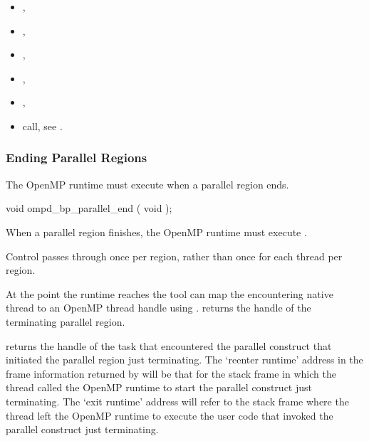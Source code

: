 \crossreferences

\begin{itemize}
\item
  , 
\item
  , 
\item
  , 
\item
  , 
\item
  , 
\item {} call, see 
  .
\end{itemize}

\subsubsection{Ending Parallel Regions}
\label{subsubsec:ompd_bp_parallel_end}

The OpenMP runtime must execute %
when a parallel region ends.


\begin{cspecific}
\begin{ompSyntax}
void ompd_bp_parallel_end ( void );
\end{ompSyntax}
\end{cspecific}


\descr

When a parallel region finishes, the OpenMP runtime must 
execute .

Control passes through 
once per region, rather than once for each thread per region.

At the point the runtime reaches 
the tool can map the encountering native thread
to an OpenMP thread handle using .
returns the handle of the terminating parallel region.

returns the handle of the task that encountered the
parallel construct that initiated the parallel region just
terminating.
The `reenter runtime' address in the frame information returned by
will be that for the stack frame in which the thread called the
OpenMP runtime to start the parallel construct just terminating.
The `exit runtime' address will refer to the stack frame where the
thread left the OpenMP runtime to execute the user code that
invoked the parallel construct just terminating.

